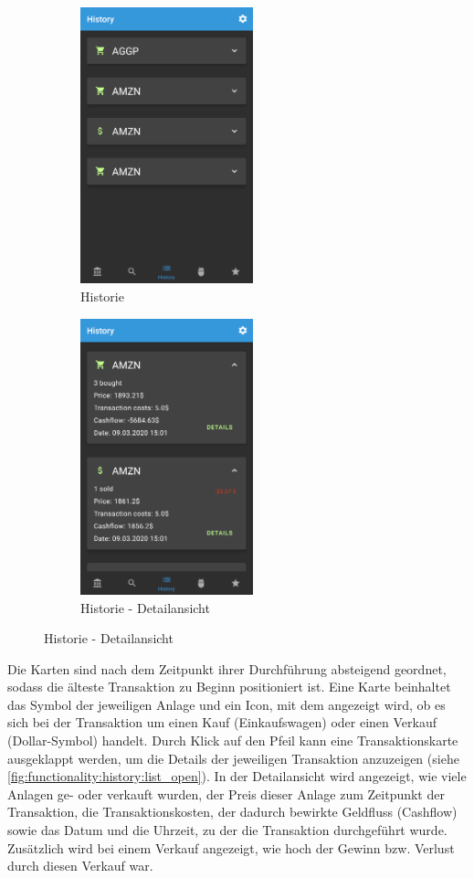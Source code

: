 \documentclass[a4paper]{article}
\begin{document}
\begin{figure}[H]
	\begin{subfigure}{.5\textwidth}
		\centering
		\includegraphics[height=8cm,keepaspectratio]{./images/history_list.png}
		\caption{Historie}
		\label{fig:functionality:history:list}
	\end{subfigure}
	\begin{subfigure}{.5\textwidth}
		\centering
		\includegraphics[height=8cm,keepaspectratio]{./images/history_list_open.png}
		\caption{Historie - Detailansicht}
		\label{fig:functionality:history:list_open}
	\end{subfigure}
\end{figure}

Die Karten sind nach dem Zeitpunkt ihrer Durchführung absteigend geordnet, sodass die älteste Transaktion zu Beginn positioniert ist. Eine Karte beinhaltet das Symbol der jeweiligen Anlage und ein Icon, mit dem angezeigt wird, ob es sich bei der Transaktion um einen Kauf (Einkaufswagen) oder einen Verkauf (Dollar-Symbol) handelt. Durch Klick auf den Pfeil kann eine Transaktionskarte ausgeklappt werden, um die Details der jeweiligen Transaktion anzuzeigen (siehe \autoref{fig:functionality:history:list_open}). In der Detailansicht wird angezeigt, wie viele Anlagen ge- oder verkauft wurden, der Preis dieser Anlage zum Zeitpunkt der Transaktion, die Transaktionskosten, der dadurch bewirkte Geldfluss (Cashflow) sowie das Datum und die Uhrzeit, zu der die Transaktion durchgeführt wurde. Zusätzlich wird bei einem Verkauf angezeigt, wie hoch der Gewinn bzw. Verlust durch diesen Verkauf war.
\end{document}
